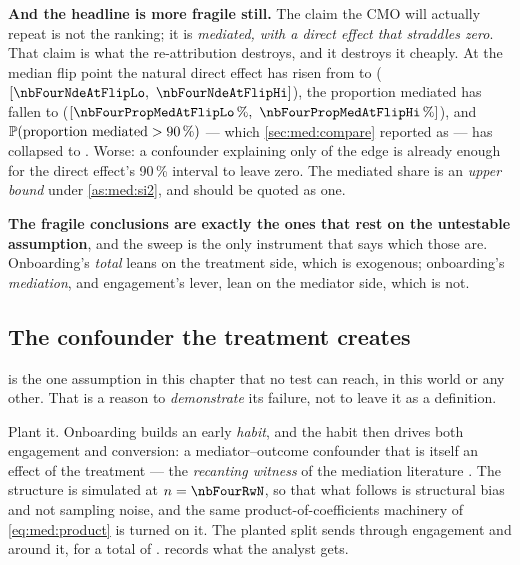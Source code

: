 \textbf{And the headline is more fragile still.} The claim the CMO will actually repeat is not the
ranking; it is \pc{\nbFourPropMediated} \emph{mediated, with a direct effect that straddles zero}.
That claim is what the re-attribution destroys, and it destroys it cheaply. At the median flip point
the natural direct effect has risen from \nbFourBayesDirect{} to \nbFourNdeAtFlip{}
($[\nbFourNdeAtFlipLo,\ \nbFourNdeAtFlipHi]$), the proportion mediated has fallen to
\pc{\nbFourPropMedAtFlip} ($[\pc{\nbFourPropMedAtFlipLo},\ \pc{\nbFourPropMedAtFlipHi}]$), and
$\operatorname{\mathbb{P}}(\text{proportion mediated} > 90\,\%)$ --- which \cref{sec:med:compare} reported as
\nbFourPPropGtNinety{} --- has collapsed to \nbFourPPropGtNinetyAtFlip. Worse: a confounder
explaining only \pc{\nbFourNdeClearsZeroPct} of the edge is already enough for the direct effect's
90\,\% interval to leave zero. The mediated share is an \emph{upper bound} under
\cref{as:med:si2}, and should be quoted as one.

\textbf{The fragile conclusions are exactly the ones that rest on the untestable assumption}, and the
sweep is the only instrument that says which those are. Onboarding's \emph{total} leans on the
treatment side, which is exogenous; onboarding's \emph{mediation}, and engagement's lever, lean on
the mediator side, which is not.

\subsection*{The confounder the treatment creates}

 is the one assumption in this chapter that no test can reach, in this world
or any other. That is a reason to \emph{demonstrate} its failure, not to leave it as a definition.

Plant it. Onboarding builds an early \emph{habit}, and the habit then drives both engagement and
conversion: a mediator--outcome confounder that is itself an effect of the treatment --- the
\emph{recanting witness} of the mediation literature \citep{avin2005}. The structure is simulated at
$n = \nbFourRwN$, so that what follows is structural bias and not sampling noise, and the same
product-of-coefficients machinery of \cref{eq:med:product} is turned on it. The planted split sends
\nbFourRwPlantedViaM{} through engagement and \nbFourRwPlantedNotM{} around it, for a total of
\nbFourRwPlantedTotal.  records what the analyst gets.



